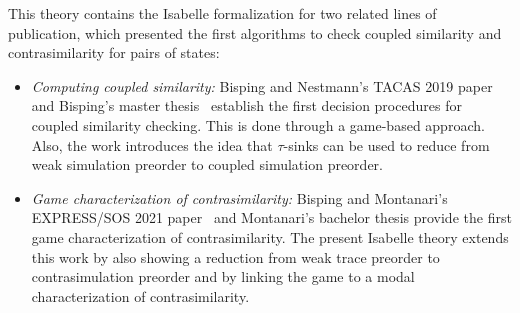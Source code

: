 \documentclass[10pt,a4paper]{article}
\begin{document}
This theory contains the Isabelle formalization for two related lines of publication, which presented
the first algorithms to check coupled similarity and contrasimilarity for pairs of states:

\begin{itemize}
  \item \emph{Computing coupled similarity:} Bisping and Nestmann's TACAS 2019 paper~%
    \cite{bn2019coupledsimTacas} and Bisping's master thesis~\cite{bisping2018coupledsim}
    establish the first decision procedures for coupled similarity checking.
    This is done through a game-based approach.
    Also, the work introduces the idea that $\tau$-sinks can be used to reduce from weak simulation
    preorder to coupled simulation preorder.
  \item \emph{Game characterization of contrasimilarity:} Bisping and Montanari's
    EXPRESS/SOS 2021 paper~\cite{bm2021contrasimilarity} and Montanari's bachelor thesis provide
    the first game characterization of contrasimilarity.
    The present Isabelle theory extends this work by also showing a reduction from weak trace preorder to
    contrasimulation preorder and by linking the game to a modal characterization of contrasimilarity.
\end{itemize}
\end{document}
